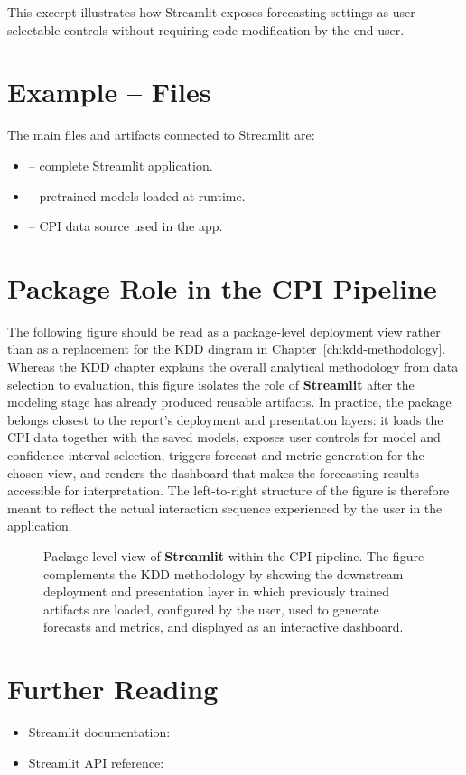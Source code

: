 This excerpt illustrates how Streamlit exposes forecasting settings as user-selectable controls without requiring code modification by the end user.

\section{Example -- Files}

The main files and artifacts connected to Streamlit are:

\begin{itemize}
    \item {} -- complete Streamlit application.
    \item {} -- pretrained models loaded at runtime.
    \item {} -- CPI data source used in the app.
\end{itemize}

\section{Package Role in the CPI Pipeline}

The following figure should be read as a package-level deployment view rather than as a replacement for the KDD diagram in Chapter~\ref{ch:kdd-methodology}. Whereas the KDD chapter explains the overall analytical methodology from data selection to evaluation, this figure isolates the role of \textbf{Streamlit} after the modeling stage has already produced reusable artifacts. In practice, the package belongs closest to the report's deployment and presentation layers: it loads the CPI data together with the saved models, exposes user controls for model and confidence-interval selection, triggers forecast and metric generation for the chosen view, and renders the dashboard that makes the forecasting results accessible for interpretation. The left-to-right structure of the figure is therefore meant to reflect the actual interaction sequence experienced by the user in the application.

\begin{figure}[htbp]
\centering
\resizebox{0.95\linewidth}{!}{
}
\caption{Package-level view of \textbf{Streamlit} within the CPI pipeline. The figure complements the KDD methodology by showing the downstream deployment and presentation layer in which previously trained artifacts are loaded, configured by the user, used to generate forecasts and metrics, and displayed as an interactive dashboard.}
\label{fig:streamlit_workflow}
\end{figure}

\section{Further Reading}

\begin{itemize}
    \item Streamlit documentation: 
    \item Streamlit API reference: 
\end{itemize}
